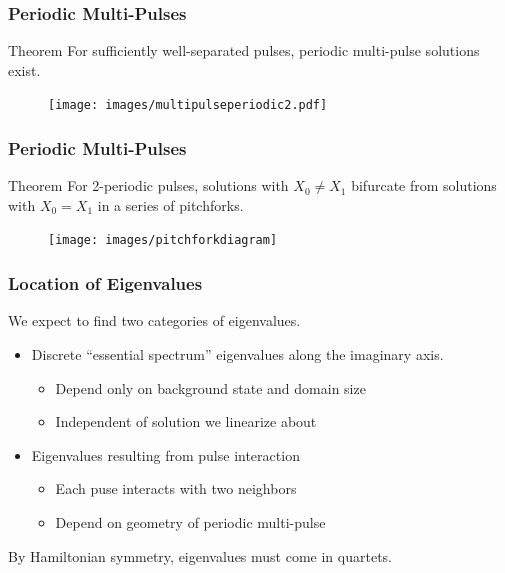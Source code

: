 \documentclass[16pt]{beamer}
\begin{document}
\begin{frame}
\frametitle{Periodic Multi-Pulses} 
	\fontsize{16}{7.2}\selectfont
    \begin{block}{Theorem}
    For sufficiently well-separated pulses, periodic multi-pulse solutions exist.

	\begin{figure}
	\begin{center}
	\texttt{[image: images/multipulseperiodic2.pdf]}
	\end{center}
	\end{figure}
    \end{block}
\end{frame}

\begin{frame}
\frametitle{Periodic Multi-Pulses} 
	\fontsize{16}{7.2}\selectfont
    \begin{block}{Theorem}
    For 2-periodic pulses, solutions with $X_0 \neq X_1$ bifurcate from solutions with $X_0 = X_1$ in a series of pitchforks.

	\begin{figure}
	\begin{center}
	\texttt{[image: images/pitchforkdiagram]}
	\end{center}
	\end{figure}
    \end{block}
\end{frame}

\begin{frame}
	\frametitle{Location of Eigenvalues}
	\fontsize{16}{7.2}\selectfont
	We expect to find two categories of eigenvalues.

	\begin{itemize}
		\item Discrete ``essential spectrum'' eigenvalues along the imaginary axis.
		\begin{itemize}
			\item Depend only on background state and domain size
			\item Independent of solution we linearize about
		\end{itemize}
		\item Eigenvalues resulting from pulse interaction 
		\begin{itemize}
			\item Each puse interacts with two neighbors
			\item Depend on geometry of periodic multi-pulse
		\end{itemize}
	\end{itemize}
	\vspace{0.5cm}

	By Hamiltonian symmetry, eigenvalues must come in quartets.
\end{frame}
\end{document}
